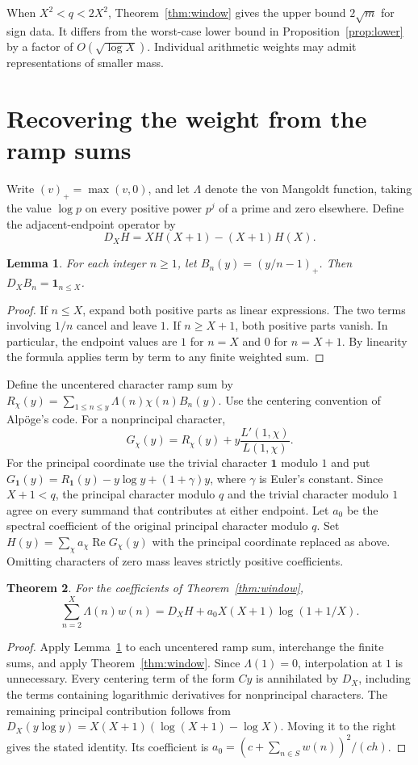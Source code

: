\documentclass[11pt,a4paper]{article}
\newtheorem{theorem}{Theorem}
\newtheorem{lemma}[theorem]{Lemma}
\newcommand{\ind}{\mathbf{1}}
\newcommand{\RePart}{\operatorname{Re}}
\begin{document}
When $X^2<q<2X^2$, Theorem~\ref{thm:window} gives the upper bound $2\sqrt m$ for sign data. It differs from the worst-case lower bound in Proposition~\ref{prop:lower} by a factor of $O(\sqrt{\log X})$. Individual arithmetic weights may admit representations of smaller mass.

\section{Recovering the weight from the ramp sums}
Write $(v)_+=\max(v,0)$, and let $\Lambda$ denote the von Mangoldt function, taking the value $\log p$ on every positive power $p^j$ of a prime and zero elsewhere. Define the adjacent-endpoint operator by
\[
  D_XH=XH(X+1)-(X+1)H(X).
\]
\begin{lemma}\label{lem:ramp}
For each integer $n\ge1$, let $B_n(y)=(y/n-1)_+$. Then $D_XB_n=\ind_{n\le X}$.
\end{lemma}
\begin{proof}
If $n\le X$, expand both positive parts as linear expressions. The two terms involving $1/n$ cancel and leave $1$. If $n\ge X+1$, both positive parts vanish. In particular, the endpoint values are $1$ for $n=X$ and $0$ for $n=X+1$. By linearity the formula applies term by term to any finite weighted sum.
\end{proof}

Define the uncentered character ramp sum by $R_\chi(y)=\sum_{1\le n\le y}\Lambda(n)\chi(n) B_n(y)$. Use the centering convention of Alp\"oge's code. For a nonprincipal character,
\[
  G_\chi(y)=R_\chi(y)+y\frac{L'(1,\chi)}{L(1,\chi)}.
\]
For the principal coordinate use the trivial character $\mathbf1$ modulo $1$ and put $G_{\mathbf1}(y)=R_{\mathbf1}(y)-y\log y+(1+\gamma)y$, where $\gamma$ is Euler's constant. Since $X+1<q$, the principal character modulo $q$ and the trivial character modulo $1$ agree on every summand that contributes at either endpoint. Let $a_0$ be the spectral coefficient of the original principal character modulo $q$. Set $H(y)=\sum_\chi a_\chi\RePart G_\chi(y)$ with the principal coordinate replaced as above. Omitting characters of zero mass leaves strictly positive coefficients.

\begin{theorem}\label{thm:endpoint}
For the coefficients of Theorem~\ref{thm:window},
\[
  \sum_{n=2}^{X}\Lambda(n)w(n)
       =D_XH+a_0X(X+1)\log(1+1/X).
\]
\end{theorem}
\begin{proof}
Apply Lemma~\ref{lem:ramp} to each uncentered ramp sum, interchange the finite sums, and apply Theorem~\ref{thm:window}. Since $\Lambda(1)=0$, interpolation at $1$ is unnecessary. Every centering term of the form $Cy$ is annihilated by $D_X$, including the terms containing logarithmic derivatives for nonprincipal characters. The remaining principal contribution follows from $D_X(y\log y)=X(X+1)(\log(X+1)-\log X)$. Moving it to the right gives the stated identity. Its coefficient is $a_0=(c+\sum_{n\in S}w(n))^2/(ch)$.
\end{proof}
\end{document}
